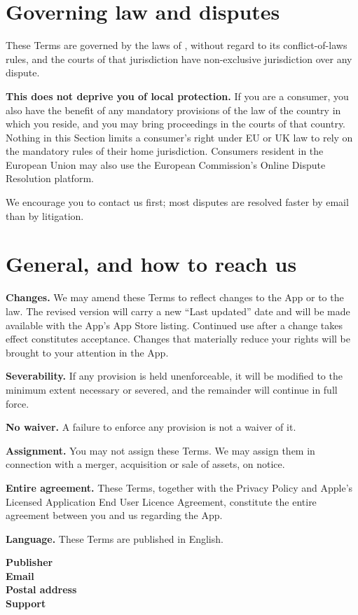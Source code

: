 \documentclass[11pt]{article}
\newcommand{\publisher}{\ph{DEVELOPER LEGAL NAME}}
\begin{document}
\section{Governing law and disputes}

These Terms are governed by the laws of , without regard to its conflict-of-laws rules, and the courts of that
jurisdiction have non-exclusive jurisdiction over any dispute.

\textbf{This does not deprive you of local protection.} If you are a consumer, you also
have the benefit of any mandatory provisions of the law of the country in which you
reside, and you may bring proceedings in the courts of that country. Nothing in this
Section limits a consumer's right under EU or UK law to rely on the mandatory rules of
their home jurisdiction. Consumers resident in the European Union may also use the
European Commission's Online Dispute Resolution platform.

We encourage you to contact us first; most disputes are resolved faster by email than
by litigation.

\section{General, and how to reach us}

\textbf{Changes.} We may amend these Terms to reflect changes to the App or to the law.
The revised version will carry a new “Last updated” date and will be made available
with the App's App Store listing. Continued use after a change takes effect constitutes
acceptance. Changes that materially reduce your rights will be brought to your attention
in the App.

\textbf{Severability.} If any provision is held unenforceable, it will be modified to
the minimum extent necessary or severed, and the remainder will continue in full force.

\textbf{No waiver.} A failure to enforce any provision is not a waiver of it.

\textbf{Assignment.} You may not assign these Terms. We may assign them in connection
with a merger, acquisition or sale of assets, on notice.

\textbf{Entire agreement.} These Terms, together with the Privacy Policy and Apple's
Licensed Application End User Licence Agreement, constitute the entire agreement
between you and us regarding the App.

\textbf{Language.} These Terms are published in English. 

\begin{plainbox}
\uifont
\textbf{Publisher}\quad \publisher \\[3pt]
\textbf{Email}\quad {} \\[3pt]
\textbf{Postal address}\quad {} \\[3pt]
\textbf{Support}\quad {}
\end{plainbox}
\end{document}
